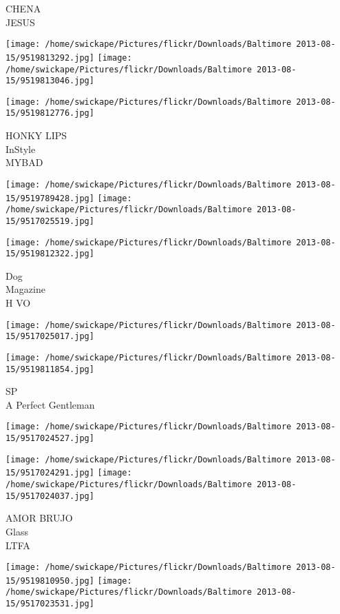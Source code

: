 \documentclass[10pt,letterpaper]{article}
\begin{document}
CHENA\\
JESUS
\pagebreak

\texttt{[image: /home/swickape/Pictures/flickr/Downloads/Baltimore 2013-08-15/9519813292.jpg]}
\texttt{[image: /home/swickape/Pictures/flickr/Downloads/Baltimore 2013-08-15/9519813046.jpg]}

\vspace{0.25in}
\texttt{[image: /home/swickape/Pictures/flickr/Downloads/Baltimore 2013-08-15/9519812776.jpg]}

HONKY LIPS\\
InStyle\\
MYBAD
\pagebreak

\texttt{[image: /home/swickape/Pictures/flickr/Downloads/Baltimore 2013-08-15/9519789428.jpg]}
\texttt{[image: /home/swickape/Pictures/flickr/Downloads/Baltimore 2013-08-15/9517025519.jpg]}

\texttt{[image: /home/swickape/Pictures/flickr/Downloads/Baltimore 2013-08-15/9519812322.jpg]}

Dog\\
Magazine\\
H VO
\pagebreak

\texttt{[image: /home/swickape/Pictures/flickr/Downloads/Baltimore 2013-08-15/9517025017.jpg]}

\vspace{0.25in}
\texttt{[image: /home/swickape/Pictures/flickr/Downloads/Baltimore 2013-08-15/9519811854.jpg]}

SP\\
A Perfect Gentleman
\pagebreak

\texttt{[image: /home/swickape/Pictures/flickr/Downloads/Baltimore 2013-08-15/9517024527.jpg]}

\vspace{0.25in}
\texttt{[image: /home/swickape/Pictures/flickr/Downloads/Baltimore 2013-08-15/9517024291.jpg]}
\texttt{[image: /home/swickape/Pictures/flickr/Downloads/Baltimore 2013-08-15/9517024037.jpg]}

AMOR BRUJO\\
Glass\\
LTFA
\pagebreak

\texttt{[image: /home/swickape/Pictures/flickr/Downloads/Baltimore 2013-08-15/9519810950.jpg]}
\texttt{[image: /home/swickape/Pictures/flickr/Downloads/Baltimore 2013-08-15/9517023531.jpg]}
\end{document}
